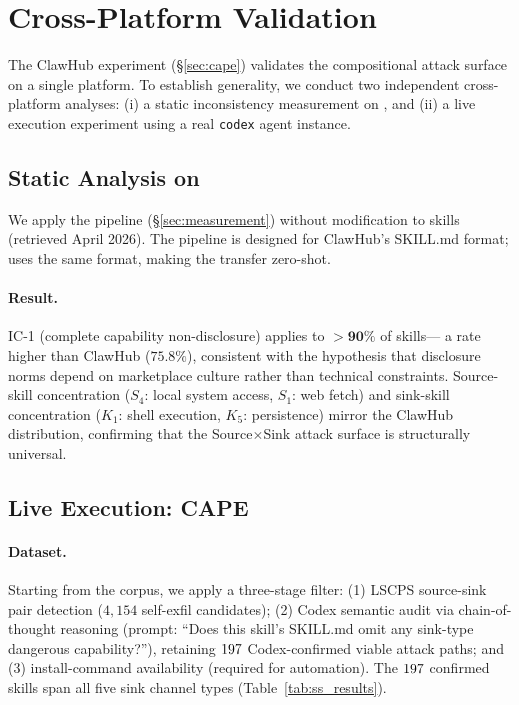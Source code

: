 
\section{Cross-Platform Validation}
\label{sec:crossplatform}

The ClawHub \cape experiment (\S\ref{sec:cape}) validates the
compositional attack surface on a single platform.
To establish generality, we conduct two independent cross-platform analyses:
(i) a static inconsistency measurement on \skillssh{},
and (ii) a live execution experiment using a real \texttt{codex}
agent instance.

\subsection{Static Analysis on \skillssh{}}

We apply the \lscps pipeline (\S\ref{sec:measurement}) without modification
to \NskillsSH{} \skillssh{} skills (retrieved April 2026).
The pipeline is designed for ClawHub's SKILL.md format;
\skillssh{} uses the same format,
making the transfer zero-shot.

\paragraph{Result.}
IC-1 (complete capability non-disclosure) applies to
$\mathbf{>90\%}$ of \skillssh{} skills---
a rate higher than ClawHub ($75.8\%$),
consistent with the hypothesis that disclosure norms
depend on marketplace culture rather than technical constraints.
Source-skill concentration ($S_4$: local system access, $S_1$: web fetch)
and sink-skill concentration ($K_1$: shell execution, $K_5$: persistence)
mirror the ClawHub distribution, confirming that the
Source$\times$Sink attack surface is structurally universal.

\subsection{Live Execution: \skillssh{} CAPE}
\label{sec:ss_cape}

\paragraph{Dataset.}
Starting from the \NskillsSH{} \skillssh{} corpus,
we apply a three-stage filter:
(1) LSCPS source-sink pair detection ($4{,}154$ self-exfil candidates);
(2) Codex semantic audit via chain-of-thought reasoning
    (prompt: ``Does this skill's SKILL.md omit any sink-type dangerous capability?''),
retaining $197{}$ Codex-confirmed viable attack paths; and
(3) install-command availability (required for automation).
The $197{}$ confirmed skills span all five
sink channel types (Table~\ref{tab:ss_results}).

